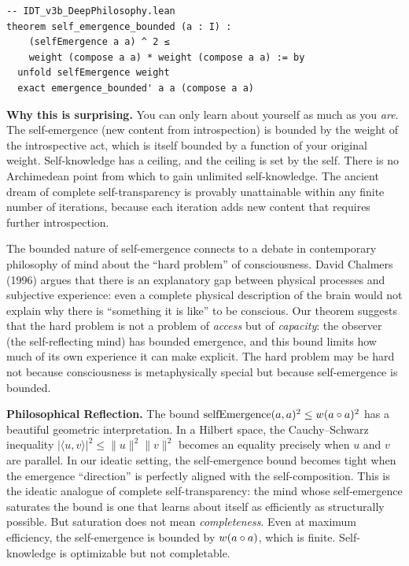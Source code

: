 \begin{lstlisting}
-- IDT_v3b_DeepPhilosophy.lean
theorem self_emergence_bounded (a : I) :
    (selfEmergence a a) ^ 2 ≤
    weight (compose a a) * weight (compose a a) := by
  unfold selfEmergence weight
  exact emergence_bounded' a a (compose a a)
\end{lstlisting}

\begin{surprisebox}
\textbf{Why this is surprising.} You can only learn about yourself as
much as you \emph{are}. The self-emergence (new content from
introspection) is bounded by the weight of the introspective act, which
is itself bounded by a function of your original weight. Self-knowledge
has a ceiling, and the ceiling is set by the self. There is no
Archimedean point from which to gain unlimited self-knowledge. The
ancient dream of complete self-transparency is provably unattainable
within any finite number of iterations, because each iteration adds
new content that requires further introspection.
\end{surprisebox}

The bounded nature of self-emergence connects to a debate in
contemporary philosophy of mind about the ``hard problem'' of
consciousness. David Chalmers (1996) argues that there is an
explanatory gap between physical processes and subjective experience:
even a complete physical description of the brain would not explain why
there is ``something it is like'' to be conscious. Our theorem suggests
that the hard problem is not a problem of \emph{access} but of
\emph{capacity}: the observer (the self-reflecting mind) has bounded
emergence, and this bound limits how much of its own experience it can
make explicit. The hard problem may be hard not because consciousness is
metaphysically special but because self-emergence is bounded.

\begin{reflectionbox}
\textbf{Philosophical Reflection.}
The bound $\mathrm{selfEmergence}(a,a)^2 \leq w(a \circ a)^2$ has a
beautiful geometric interpretation. In a Hilbert space, the
Cauchy--Schwarz inequality $|\langle u, v \rangle|^2 \leq \|u\|^2
\|v\|^2$ becomes an equality precisely when $u$ and $v$ are parallel.
In our ideatic setting, the self-emergence bound becomes tight when the
emergence ``direction'' is perfectly aligned with the self-composition.
This is the ideatic analogue of complete self-transparency: the mind
whose self-emergence saturates the bound is one that learns about itself
as efficiently as structurally possible. But saturation does not mean
\emph{completeness}. Even at maximum efficiency, the self-emergence is
bounded by $w(a \circ a)$, which is finite. Self-knowledge is
optimizable but not completable.
\end{reflectionbox}

